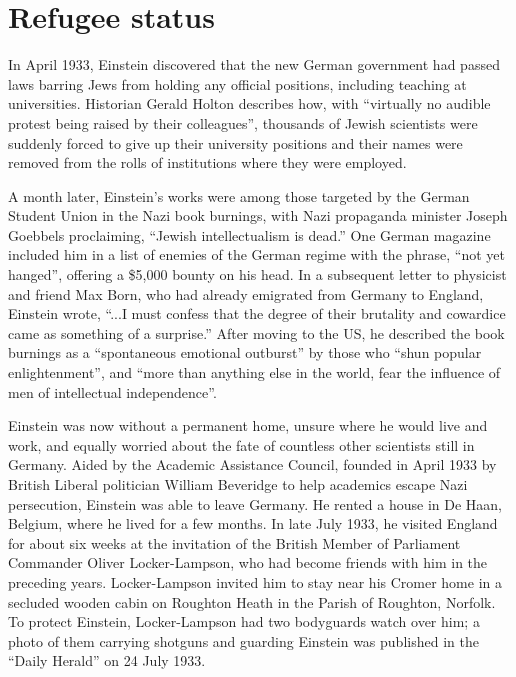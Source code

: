 \documentclass[twoside]{memoir}
\begin{document}
\section{Refugee status}\label{refugee-status}

In April 1933, Einstein discovered that the new German government had passed laws barring Jews from holding any official positions, including teaching at universities. Historian Gerald Holton describes how, with \enquote{virtually no audible protest being raised by their colleagues}, thousands of Jewish scientists were suddenly forced to give up their university positions and their names were removed from the rolls of institutions where they were employed.

A month later, Einstein's works were among those targeted by the German Student Union in the Nazi book burnings, with Nazi  propaganda minister Joseph Goebbels proclaiming, \enquote{Jewish intellectualism is dead.} One German magazine included him in a list of enemies of the German regime with the phrase, \enquote{not yet hanged}, offering a \$5,000 bounty on his head. In a subsequent letter to physicist and friend Max Born,  who had already emigrated from Germany  to England, Einstein wrote, \enquote{...I must confess that the degree of their brutality and cowardice came as something of a surprise.} After moving to the US, he described the book burnings as a \enquote{spontaneous emotional outburst} by those who \enquote{shun popular enlightenment}, and \enquote{more than anything else in the world, fear the influence of men of intellectual independence}.

Einstein was now without a permanent home, unsure where he would live and work, and equally worried about the fate of countless other scientists still in Germany. Aided by the Academic Assistance Council,  founded in April 1933 by British Liberal politician William Beveridge to help academics escape Nazi persecution, Einstein was able to leave Germany. He rented a house in De Haan, Belgium, where he lived for a few months. In late July 1933, he visited England for about six weeks at the invitation of the British Member of Parliament Commander Oliver Locker-Lampson, who had become friends with him in the preceding years. Locker-Lampson invited him to stay near his Cromer home in a secluded wooden cabin on Roughton Heath in the Parish of Roughton, Norfolk. To protect Einstein, Locker-Lampson had two bodyguards watch over him; a photo of them carrying shotguns and guarding Einstein was published in the \enquote{Daily Herald} on 24 July 1933.\cite{3zIp7}
\end{document}
